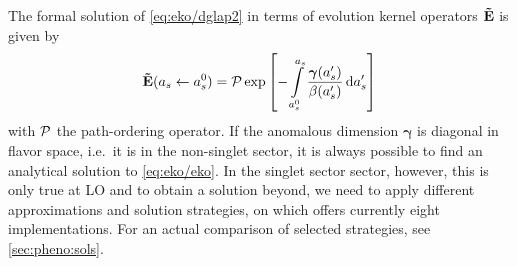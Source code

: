 The formal solution of \cref{eq:eko/dglap2} in terms of evolution kernel operators
$\vb {\tilde E}$ is given by
\begin{equation}
    \vb {\tilde E}(a_s \leftarrow a_s^0)  = \mathcal{P} \exp\qty[-\int\limits_{a_s^0}^{a_s} \frac{\bm{\gamma}(a_s')}{\beta(a_s')} \dd{a_s'} ]
    \label{eq:eko/eko}
\end{equation}
with $\mathcal{P}$ the path-ordering operator. If the anomalous dimension $\bm{\gamma}$ is
diagonal in flavor space, i.e.\ it is in the non-singlet sector, it is always
possible to find an analytical solution to \cref{eq:eko/eko}.  In the singlet
sector sector, however, this is only true at LO and to obtain a solution
beyond, we need to apply different approximations and solution strategies, on
which \eko{} offers currently eight implementations. For an actual comparison
of selected strategies, see \cref{sec:pheno:sols}.
